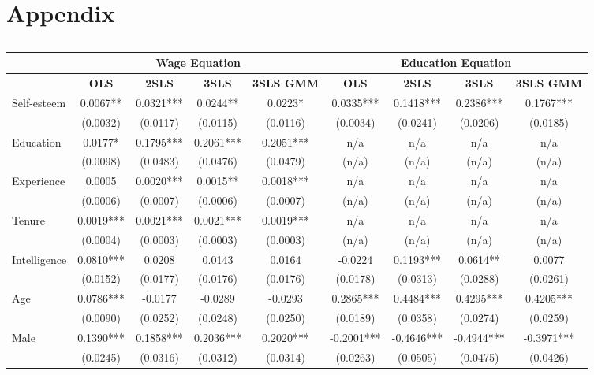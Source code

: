 \documentclass[12pt]{report}
\newcommand{\prbf}[1]{\textbf{#1}}
\begin{document}
\chapter*{Appendix}
\begin{sidewaystable}
\small
\caption{\label{tab:wage80}}
\vspace{2pt}
\centering\begin{tabular}{lc|c|c|c|c|c|c|c}
\hline
\hline
& \multicolumn{4}{|c|}{Wage Equation} & \multicolumn{4}{|c}{Education Equation}\\
\hline
& \prbf{OLS} & \prbf{2SLS} & \prbf{3SLS} & \prbf{3SLS GMM} & \prbf{OLS} & \prbf{2SLS} & \prbf{3SLS} & \prbf{3SLS GMM}\\
\hline
Self-esteem & 0.0067** & 0.0321*** & 0.0244** & 0.0223* & 0.0335*** & 0.1418*** & 0.2386*** & 0.1767***\\
& (0.0032) & (0.0117) & (0.0115) & (0.0116) & (0.0034) & (0.0241) & (0.0206) & (0.0185)\\
Education & 0.0177* & 0.1795*** & 0.2061*** & 0.2051*** & n/a & n/a & n/a & n/a\\
& (0.0098) & (0.0483) & (0.0476) & (0.0479) & (n/a) & (n/a) & (n/a) & (n/a)\\
Experience & 0.0005 & 0.0020*** & 0.0015** & 0.0018*** & n/a & n/a & n/a & n/a\\
& (0.0006) & (0.0007) & (0.0006) & (0.0007) & (n/a) & (n/a) & (n/a) & (n/a)\\
Tenure & 0.0019*** & 0.0021*** & 0.0021*** & 0.0019*** & n/a & n/a & n/a & n/a\\
& (0.0004) & (0.0003) & (0.0003) & (0.0003) & (n/a) & (n/a) & (n/a) & (n/a)\\
Intelligence & 0.0810*** & 0.0208 & 0.0143 & 0.0164 & -0.0224 & 0.1193*** & 0.0614** & 0.0077\\
& (0.0152) & (0.0177) & (0.0176) & (0.0176) & (0.0178) & (0.0313) & (0.0288) & (0.0261)\\
Age & 0.0786*** & -0.0177 & -0.0289 & -0.0293 & 0.2865*** & 0.4484*** & 0.4295*** & 0.4205***\\
& (0.0090) & (0.0252) & (0.0248) & (0.0250) & (0.0189) & (0.0358) & (0.0274) & (0.0259)\\
Male & 0.1390*** & 0.1858*** & 0.2036*** & 0.2020*** & -0.2001*** & -0.4646*** & -0.4944*** & -0.3971***\\
& (0.0245) & (0.0316) & (0.0312) & (0.0314) & (0.0263) & (0.0505) & (0.0475) & (0.0426)\\

\end{tabular}
\end{sidewaystable}
\end{document}
